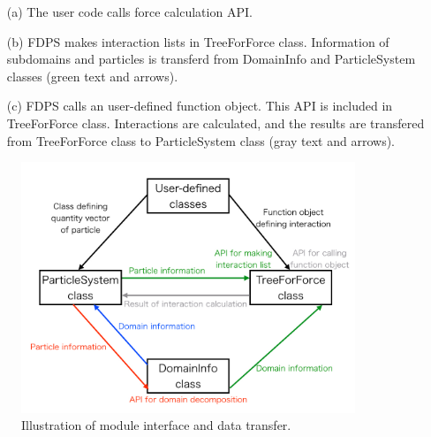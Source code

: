 \begin{enumerate}
\item[(a)] The user code calls force calculation API.

\item[(b)] FDPS makes interaction lists in TreeForForce
  class. Information of subdomains and particles is transferd from
  DomainInfo and ParticleSystem classes (green text and arrows).

\item[(c)] FDPS calls an user-defined function object. This API is
  included in TreeForForce class.  Interactions are calculated, and
  the results are transfered from TreeForForce class to ParticleSystem
  class (gray text and arrows).
\end{enumerate}

\begin{figure}[h]
  \begin{center}
    \includegraphics[width=10cm,bb=0 0 700 700]{fig/illustration/illustration.001.jpg}
  \end{center}
  \caption{Illustration of module interface and data transfer.}
  \label{fig:brief_interface}
\end{figure}
